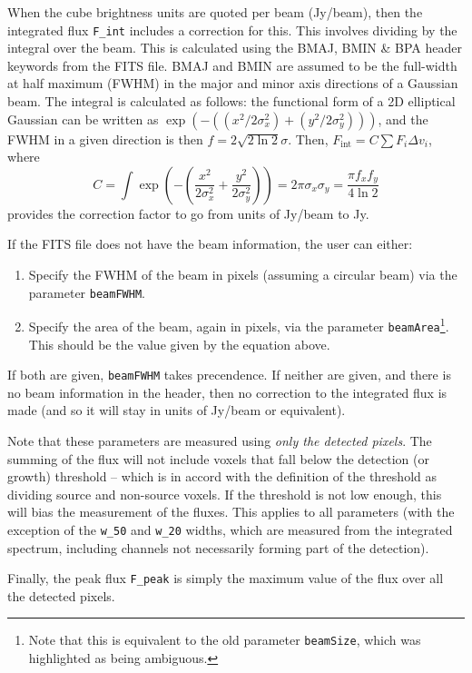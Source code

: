 When the cube brightness units are quoted per beam (\eg Jy/beam), then
the integrated flux \texttt{F\_int} includes a correction for
this. This involves dividing by the integral over the beam. This is
calculated using the BMAJ, BMIN \& BPA header keywords from the FITS
file. BMAJ and BMIN are assumed to be the full-width at half maximum
(FWHM) in the major and minor axis directions of a Gaussian beam. The
integral is calculated as follows: the functional form of a 2D
elliptical Gaussian can be written as
$\exp(-((x^2/2\sigma_x^2)+(y^2/2\sigma_y^2)))$, and the FWHM in a
given direction is then $f=2\sqrt{2\ln2}\sigma$. Then, $F_\text{int} =
C \sum F_i \Delta v_i$, where 
\[
C = \int\exp\left(-\left(\frac{x^2}{2\sigma_x^2}+\frac{y^2}{2\sigma_y^2}\right)\right)
= 2\pi\sigma_x\sigma_y
=\frac{\pi f_x f_y}{4\ln2}
\]
provides the correction factor to go from units of Jy/beam to Jy.

If the FITS file does not have the beam information, the user can
either:
\begin{enumerate}
\item Specify the FWHM of the beam in pixels (assuming a circular
  beam) via the parameter \texttt{beamFWHM}.
\item Specify the area of the beam, again in pixels, via the parameter
  \texttt{beamArea}\footnote{Note that this is equivalent to the old
    parameter \texttt{beamSize}, which was highlighted as being
    ambiguous.}. This should be the value given by the equation above.
\end{enumerate}
If both are given, \texttt{beamFWHM} takes precendence. If neither are
given, and there is no beam information in the header, then no
correction to the integrated flux is made (and so it will stay in
units of Jy/beam or equivalent).

Note that these parameters are measured using \textit{only the
  detected pixels}. The summing of the flux will not include voxels
that fall below the detection (or growth) threshold -- which is in
accord with the definition of the threshold as dividing source and
non-source voxels. If the threshold is not low enough, this will bias
the measurement of the fluxes. This applies to all parameters (with
the exception of the \texttt{w\_50} and \texttt{w\_20} widths, which
are measured from the integrated spectrum, including channels not
necessarily forming part of the detection).

Finally, the peak flux \texttt{F\_peak} is simply the maximum value of
the flux over all the detected pixels.


